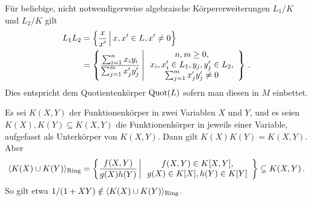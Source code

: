 \begin{itemize}
    \begin{remark}
      Für beliebige, nicht notwendigerweise algebraische Körpererweiterungen $L_1/K$ und $L_2/K$ gilt
      \begin{align*}
            L_1 L_2
        &=  \left\{
              \frac{x}{x'}
            \suchthat*
              x, x' \in L,
              x' \neq 0
            \right\}
        \\
        &=  \left\{
              \frac{\sum_{i=1}^n x_i y_i}{\sum_{j=1}^m x'_j y'_j}
            \suchthat*
              \begin{array}{c}
                n, m \geq 0,
              \\
                x_i, x'_i \in L_1,
                y_j, y'_j \in L_2,
              \\
                \sum_{j=1}^m x'_j y'_j \neq 0
              \end{array}
            \right\} \,.
      \end{align*}
      Dies entspricht dem Quotientenkörper $\operatorname{Quot}(L)$ sofern man diesen in $M$ einbettet.
    \end{remark}
    \begin{example}
      Es sei $K(X,Y)$ der Funktionenkörper in zwei Variablen $X$ und $Y$, und es seien $K(X), K(Y) \subseteq K(X,Y)$ die Funktionenkörper in jeweils einer Variable, aufgefasst als Unterkörper von $K(X,Y)$.
      Dann gilt $K(X) K(Y) = K(X,Y)$.
      Aber
      \begin{align*}
                    \generated{ K(X) \cup K(Y) }_{\text{Ring}}
        =           \left\{
                      \frac{f(X,Y)}{g(X)h(Y)}
                    \suchthat*
                      \begin{array}{c}
                      f(X,Y) \in K[X,Y],
                      \\
                      g(X) \in K[X],
                      h(Y) \in K[Y]
                      \end{array}
                    \right\}
        \subsetneq  K(X,Y) \,.
      \end{align*}
      So gilt etwa $1/(1 + XY) \notin \langle K(X) \cup K(Y) \rangle_{\text{Ring}}$.
    \end{example}
\end{itemize}





\subsection{}


